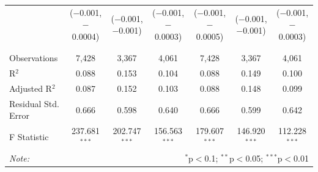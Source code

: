 \documentclass[alpha-refs]{wiley-article-01g}
\begin{document}
\begin{landscape}
\begin{table}[!htbp]
\begin{tabular}{@{\extracolsep{5pt}}lcccccc}
			& ($-$0.001, $-$0.0004) & ($-$0.001, $-$0.001) & ($-$0.001, $-$0.0003) & ($-$0.001, $-$0.0005) & ($-$0.001, $-$0.001) & ($-$0.001, $-$0.0003) \\ 
			& & & & & & \\ 
			\hline \\[-.8ex] 
			Observations & 7,428 & 3,367 & 4,061 & 7,428 & 3,367 & 4,061 \\ 
			R$^{2}$ & 0.088 & 0.153 & 0.104 & 0.088 & 0.149 & 0.100 \\ 
			Adjusted R$^{2}$ & 0.087 & 0.152 & 0.103 & 0.088 & 0.148 & 0.099 \\ 
			Residual Std. Error & 0.666 & 0.598 & 0.640 & 0.666 & 0.599 & 0.642 \\ 
			F Statistic & 237.681$^{***}$ & 202.747$^{***}$ & 156.563$^{***}$ & 179.607$^{***}$ & 146.920$^{***}$ & 112.228$^{***}$ \\ 
			\hline 
			\textit{Note:}  & \multicolumn{6}{r}{$^{*}$p$<$0.1; $^{**}$p$<$0.05; $^{***}$p$<$0.01} \\ 
		\end{tabular} 
	\end{table} 
	
\end{landscape}

\newpage
\end{document}
